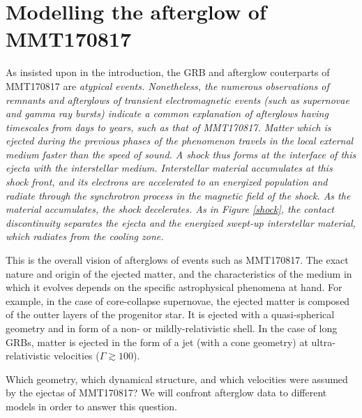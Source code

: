 \part{Modelling the afterglow of MMT170817}

As insisted upon in the introduction, the GRB and afterglow couterparts of MMT170817 are \it{atypical} events. Nonetheless, the numerous observations of remnants and afterglows of transient electromagnetic events (such as supernovae and gamma ray bursts) indicate a common explanation of afterglows having timescales from days to years, such as that of MMT170817. Matter which is ejected during the previous phases of the phenomenon travels in the local external medium faster than the speed of sound. A shock thus forms at the interface of this ejecta with the interstellar medium. Interstellar material accumulates at this shock front, and its electrons are accelerated to an energized population and radiate through the synchrotron process in the magnetic field of the shock. As the material accumulates, the shock decelerates. As in Figure \ref{shock}, the \it{contact discontinuity} separates the ejecta and the energized swept-up interstellar material, which radiates from the \it{cooling zone}.

This is the overall vision of afterglows of events such as MMT170817. The exact nature and origin of the ejected matter, and the characteristics of the medium in which it evolves depends on the specific astrophysical phenomena at hand. For example, in the case of core-collapse supernovae, the ejected matter is composed of the outter layers of the progenitor star. It is ejected with a quasi-spherical geometry and in form of a non- or mildly-relativistic shell. In the case of long GRBs, matter is ejected in the form of a jet (with a cone geometry) at ultra-relativistic velocities ($\Gamma \gtrsim 100$).

Which geometry, which dynamical structure, and which velocities were assumed by the ejectas of MMT170817? We will confront afterglow data to different models in order to answer this question.

